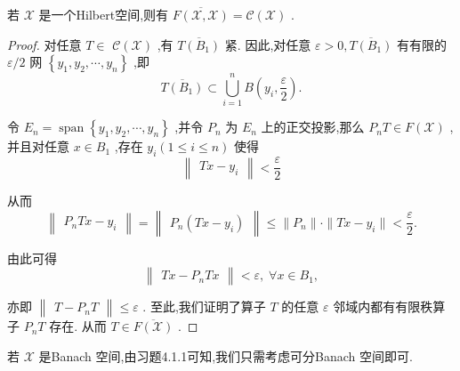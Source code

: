 \documentclass[lang=cn,newtx,10pt,scheme=chinese,thmcnt=chapter]{elegantbook}
\begin{document}
\begin{proposition}
    若 \(\mathcal{X}\) 是一个Hilbert空间,则有 \(\overline{F\left( {\mathcal{X},\mathcal{X}}\right) } = \mathcal{C}\left( \mathcal{X}\right)\) . 
\end{proposition}
\begin{proof}
    对任意 \(T \in\)  \(\mathcal{C}\left( \mathcal{X}\right)\) ,有 \(\overline{T\left( {B}_{1}\right) }\) 紧. 因此,对任意 \(\varepsilon  > 0,\overline{T\left( {B}_{1}\right) }\) 有有限的 \(\varepsilon /2\) 网 \(\left\{  {{y}_{1},{y}_{2},\cdots ,{y}_{n}}\right\}\) ,即
\begin{equation*}
\overline{T\left( {B}_{1}\right) } \subset  \mathop{\bigcup }\limits_{{i = 1}}^{n}B\left( {{y}_{i},\frac{\varepsilon }{2}}\right) .
\end{equation*}

令 \({E}_{n} = \operatorname{span}\left\{  {{y}_{1},{y}_{2},\cdots ,{y}_{n}}\right\}\) ,并令 \({P}_{n}\) 为 \({E}_{n}\) 上的正交投影,那么 \({P}_{n}T \in  F\left( \mathcal{X}\right)\) ,并且对任意 \(x \in  {B}_{1}\) ,存在 \({y}_{i}\left( {1 \leqslant  i \leqslant  n}\right)\) 使得
\begin{equation*}
\begin{Vmatrix}{{Tx} - {y}_{i}}\end{Vmatrix} < \frac{\varepsilon }{2}
\end{equation*}

从而
\begin{equation*}
\begin{Vmatrix}{{P}_{n}{Tx} - {y}_{i}}\end{Vmatrix} = \begin{Vmatrix}{{P}_{n}\left( {{Tx} - {y}_{i}}\right) }\end{Vmatrix} \leqslant \|P_n\|\cdot \|Tx-y_i\|< \frac{\varepsilon }{2}.
\end{equation*}

由此可得
\begin{equation*}
\begin{Vmatrix}{{Tx} - {P}_{n}{Tx}}\end{Vmatrix} < \varepsilon ,\;\forall x \in  {B}_{1},
\end{equation*}

亦即 \(\begin{Vmatrix}{T - {P}_{n}T}\end{Vmatrix} \leqslant  \varepsilon\) . 至此,我们证明了算子 \(T\) 的任意 \(\varepsilon\) 邻域内都有有限秩算子 \({P}_{n}T\) 存在. 从而 \(T \in  \overline{F\left( \mathcal{X}\right) }\) .
\end{proof}
 若 \(\mathcal{X}\) 是Banach 空间,由习题4.1.1可知,我们只需考虑可分Banach 空间即可.
\end{document}
